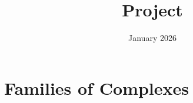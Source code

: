 \documentclass[12pt]{article}
\title{Project}
\author{}
\date{January 2026}
\begin{document}

\section{Families of Complexes}





\end{document}
